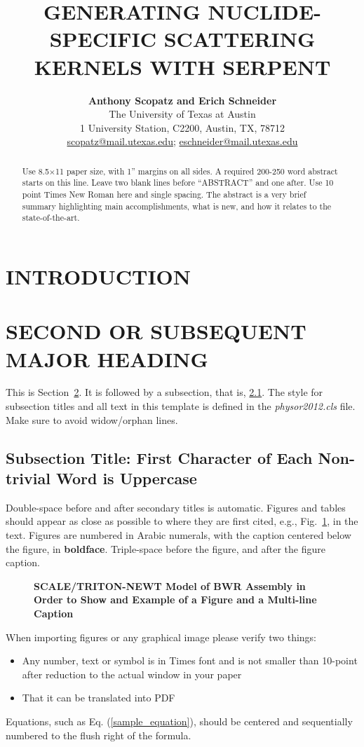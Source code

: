 \documentclass{physor2012}
\title{GENERATING NUCLIDE-SPECIFIC SCATTERING KERNELS WITH SERPENT}
\author{%
  \textbf{Anthony Scopatz and Erich Schneider} \\
  The University of Texas at Austin \\
  1 University Station, C2200, Austin, TX, 78712 \\
  \url{scopatz@mail.utexas.edu}; \url{eschneider@mail.utexas.edu} \\
}
\begin{document}
\maketitle
\begin{abstract}
  Use 8.5$\times$11 paper size, with 1'' margins on all sides.  A required 200-250 
  word abstract starts on this line.  Leave two blank lines before ``ABSTRACT''
  and one after.  Use 10 point Times New Roman here and single 
  spacing. The abstract is a very brief summary highlighting main 
  accomplishments, what is new, and how it relates to the state-of-the-art.
\end{abstract}


\section{INTRODUCTION} 



\section{SECOND OR SUBSEQUENT MAJOR HEADING} 
\label{sec:first}
%
This is Section~\ref{sec:first}. It is followed by a subsection, that is, 
\ref{sec:second}. The style for subsection titles and all text in this template is defined in 
the \emph{physor2012.cls} file.  Make sure to avoid widow/orphan lines.
%
\subsection{Subsection Title: First Character of Each Non-trivial Word is Uppercase} 
\label{sec:second}
%
Double-space before and after secondary titles is automatic.  Figures and 
tables should appear as close as possible to where they are first
cited, e.g., Fig.~\ref{fig:amdahl}, in the text.  Figures are numbered in Arabic 
numerals, with the caption centered below the figure, in \textbf{boldface}.  
Triple-space before the figure, and after the figure caption.

\begin{figure}[!htb]
  \centering
  \caption{\bf SCALE/TRITON-NEWT Model of BWR Assembly in Order to Show and Example of a Figure and a Multi-line Caption} 
  \label{fig:amdahl}
\end{figure}

When importing figures or any graphical image please verify two things:
\begin{itemize}
\item Any number, text or symbol is in Times font and is not smaller than 
  10-point after reduction to the actual window in your paper
\item That it can be translated into PDF
\end{itemize}
Equations, such as Eq. (\ref{sample_equation}), should be centered and 
sequentially numbered to the flush right of the formula.
\end{document}

